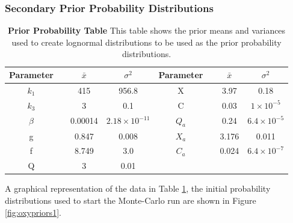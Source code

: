 
\subsubsection{Secondary Prior Probability Distributions}
\begin{table}[h]%
\renewcommand{\arraystretch}{1.5}
\begin{center}
\begin{tabular}{cccc|cccc}
\toprule
\textbf{Parameter} && ${\bar{x}}$ & $\sigma^2$ & \textbf{Parameter} && ${\bar{x}}$ & $\sigma^2$\\
\midrule
$k_1$ && 415 & 956.8 & X && 3.97 & 0.18\\
$k_3$ && 3 & 0.1 & C && 0.03 & $1\times 10^{-5}$\\
$\beta$ && 0.00014 & $2.18\times 10^{-11}$ & $Q_a$ && 0.24 & $6.4\times 10^{-5}$\\
g && 0.847 & 0.008 & $X_a$ && 3.176 & 0.011\\
f && 8.749 & 3.0 & $C_a$ && 0.024 & $6.4\times 10^{-7}$\\
Q && 3 & 0.01\\
\bottomrule
\end{tabular}
\end{center}
\caption[Second Prior Probability Table]{{\bf Prior Probability Table} This table shows the prior means and variances used to create lognormal distributions to be used as the prior probability distributions.
\label{tab:oxyProbstat1}}
\end{table}
\noindent A graphical representation of the data in Table \ref{tab:oxyProbstat1}, the initial probability distributions used to start the Monte-Carlo run are shown in Figure \ref{fig:oxypriors1}.
